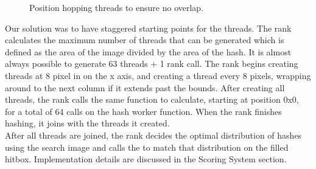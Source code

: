 \documentclass[10pt, journal]{vgtc}                %
\begin{document}
\begin{flushleft}
\begin{figure}[h!]
	\caption{Position hopping threads to ensure no overlap.}
\end{figure}
Our solution was to have staggered starting points for the threads. The rank calculates the maximum number of threads that can be generated which is defined as the area of the image divided by the area of the hash. It is almost always possible to generate 63 threads + 1 rank call. The rank begins creating threads at 8 pixel in on the x axis, and creating a thread every 8 pixels, wrapping around to the next column if it extends past the bounds. After creating all threads, the rank calls the same function to calculate, starting at position 0x0, for a total of 64 calls on the hash worker function. When the rank finishes hashing, it joins with the threads it created. \\\smallskip
After all threads are joined, the rank decides the optimal distribution of hashes using the search image and calls the  to match that distribution on the filled hitbox. Implementation details are discussed in the Scoring System section.
\end{flushleft}
\end{document}
